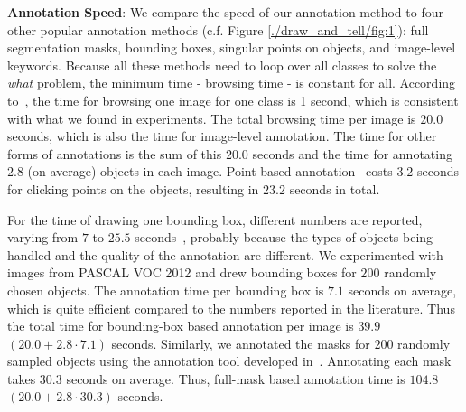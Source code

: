 \textbf{Annotation Speed}: We compare the speed of our annotation
method to four other popular annotation methods
(c.f. Figure \ref{./draw_and_tell/fig:1}): full segmentation masks, bounding boxes,
singular points on objects, and image-level keywords.  Because all these
methods need to loop over all classes to solve the \emph{what}
problem, the minimum time - browsing time - is constant for
all. According to~\citep{whatpoint}, the time for browsing one image
for one class is 1 second, which is consistent with what we found
in experiments. 
The total browsing time per image is  $20.0$ seconds, which is also the time for
image-level annotation.  The time for other forms of annotations is
the sum of this $20.0$ seconds and the time for annotating $2.8$ (on
average) objects in each image. Point-based
annotation~\citep{whatpoint} costs $3.2$ seconds for clicking points on
the objects, resulting in $23.2$ seconds in total.

For the time of drawing one bounding box, different
numbers are reported, varying from $7$ to $25.5$
seconds~\citep{best:two:world, annotation:strength}, probably because
the types of objects being handled and the quality of the annotation
are different. We experimented with images from PASCAL VOC 2012
and drew bounding boxes for $200$ randomly chosen objects. 
The annotation time per bounding box is $7.1$ seconds on average,
which is quite efficient compared to the numbers reported in the
literature. Thus the total time for bounding-box based annotation per image is
$39.9$ $(20.0+2.8 \cdot 7.1)$ seconds. Similarly, we annotated the masks for
$200$ randomly sampled objects using the annotation tool developed
in~\citep{open:surface}.
Annotating each mask takes $30.3$ seconds on
average. Thus, full-mask based annotation time is $104.8$
$(20.0+2.8\cdot 30.3)$ seconds.   %

